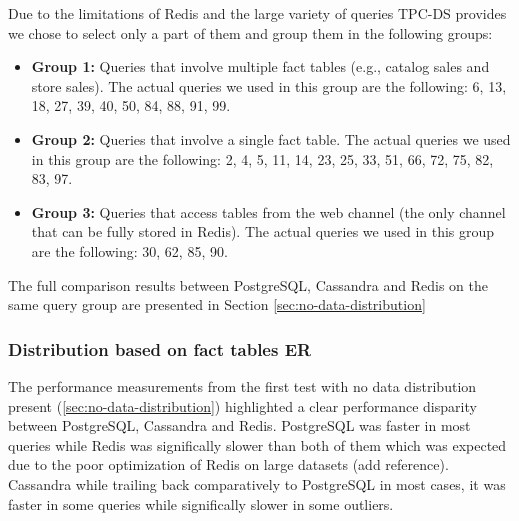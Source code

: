 \documentclass[conference]{IEEEtran}
\begin{document}
Due to the limitations of Redis and the large variety of queries TPC-DS provides we chose to select only a part of them and group them in the following groups:

\begin{itemize}
    \item \textbf{Group 1:} Queries that involve multiple fact tables (e.g., catalog sales and store sales). The actual queries we used in this group are the following: 6, 13, 18, 27, 39, 40, 50, 84, 88, 91, 99.
    \item \textbf{Group 2:} Queries that involve a single fact table. The actual queries we used in this group are the following: 2, 4, 5, 11, 14, 23, 25, 33, 51, 66, 72, 75, 82, 83, 97.
    \item \textbf{Group 3:} Queries that access tables from the web channel (the only channel that can be fully stored in Redis). The actual queries we used in this group are the following: 30, 62, 85, 90.
\end{itemize}

The full comparison results between PostgreSQL, Cassandra and Redis on the same query group are presented in Section \ref{sec:no-data-distribution}

\subsubsection{Distribution based on fact tables ER}

The performance measurements from the first test with no data distribution present (\ref{sec:no-data-distribution}) highlighted a clear performance disparity between PostgreSQL, Cassandra and Redis. PostgreSQL was faster in most queries while Redis was significally slower than both of them which was expected due to the poor optimization of Redis on large datasets (add reference). Cassandra while trailing back comparatively to PostgreSQL in most cases, it was faster in some queries while significally slower in some outliers.  %
\end{document}
